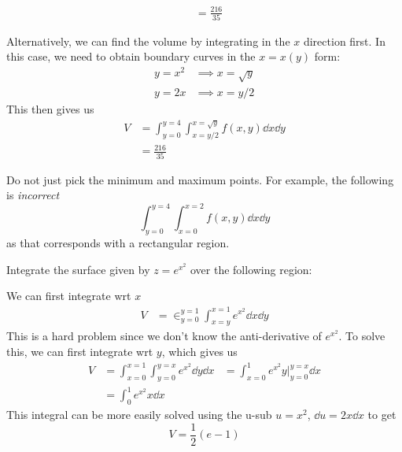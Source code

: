 \begin{itemize}
\begin{example}
\begin{enumerate}
\begin{align}
                              & = \frac{216}{35}
                        \end{align}
              \end{enumerate}
              Alternatively, we can find the volume by integrating in the $x$ direction first. In this case, we need to obtain boundary curves in the $x=x(y)$ form:
              \begin{align}
                  y=x^2 & \implies x=\sqrt{y} \\
                  y=2x  & \implies x=y/2
              \end{align}
              This then gives us
              \begin{align}
                  V & = \int_{y=0}^{y=4} \int_{x=y/2}^{x=\sqrt{y}}f(x,y)\dd{x}\dd{y} \\
                    & = \frac{216}{35}
              \end{align}
          \end{example}
          \begin{warning}
              Do not just pick the minimum and maximum points. For example, the following is \textit{incorrect}
              \begin{equation}
                  \int_{y=0}^{y=4}\int_{x=0}^{x=2}f(x,y)\dd{x}\dd{y}
              \end{equation}
              as that corresponds with a rectangular region.
          \end{warning}
          \begin{example}
              Integrate the surface given by $z=e^{x^2}$ over the following region:
              \vspace{2mm}

              We can first integrate wrt $x$
              \begin{align}
                  V & = \in_{y=0}^{y=1}\int_{x=y}^{x=1} e^{x^2}\dd{x}\dd{y}
              \end{align}
              This is a hard problem since we don't know the anti-derivative of $e^{x^2}$. To solve this, we can first integrate wrt $y$, which gives us
              \begin{align}
                  V & = \int_{x=0}^{x=1}\int_{y=0}^{y=x}e^{x^2}\dd{y}\dd{x} & = \int_{x=0}^1 e^{x^2}y\big\rvert_{y=0}^{y=x}\dd{x} \\
                    & = \int_0^1 e^{x^2}x\dd{x}
              \end{align}
              This integral can be more easily solved using the u-sub $u=x^2$, $\dd{u}=2x\dd{x}$ to get
              \begin{equation}
                  V = \frac{1}{2}(e-1)
              \end{equation}
          \end{example}
\end{itemize}